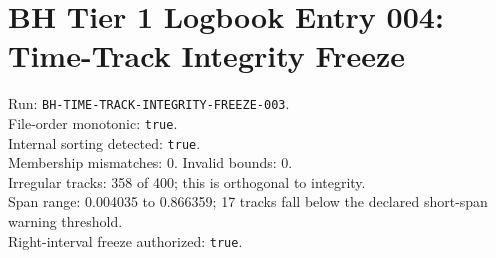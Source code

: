 \documentclass[11pt]{article}
\begin{document}
\section*{BH Tier 1 Logbook Entry 004: Time-Track Integrity Freeze}
Run: \texttt{BH-TIME-TRACK-INTEGRITY-FREEZE-003}.\\
File-order monotonic: \texttt{true}.\\
Internal sorting detected: \texttt{true}.\\
Membership mismatches: 0. Invalid bounds: 0.\\
Irregular tracks: 358 of 400; this is orthogonal to integrity.\\
Span range: 0.004035 to 0.866359; 17 tracks fall below the declared short-span warning threshold.\\
Right-interval freeze authorized: \texttt{true}.
\end{document}
